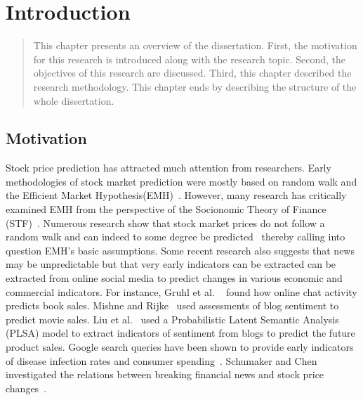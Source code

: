 \chapter{Introduction}
\label{introduction}

\begin{quote}
This chapter presents an overview of the dissertation. First, the motivation for this research is introduced along with the research topic. Second, the objectives of this research are discussed. Third, this chapter described the research methodology. This chapter ends by describing the structure of the whole dissertation.
\end{quote}

\section{Motivation}
Stock price prediction has attracted much attention from researchers. Early methodologies of stock market prediction were mostly based on random walk and the Efficient Market Hypothesis(EMH)~\cite{fama1965behavior}. However, many research has critically examined EMH from the perspective of the Socionomic Theory of Finance (STF)~\cite{prechter2007financial}. Numerous research show that stock market prices do not follow a random walk and can indeed to some degree be predicted~\cite{Butler1992} thereby calling into question EMH's basic assumptions. Some recent research also suggests that news may be unpredictable but that very early indicators can be extracted can be extracted from online social media to predict changes in various economic and commercial indicators. For instance, Gruhl et al. ~\cite{Gruhl2005} found how online chat activity predicts book sales. Mishne and Rijke~\cite{mishne2006capturing} used assessments of blog sentiment to predict movie sales. Liu et al.~\cite{liu2007arsa} used a Probabilistic Latent Semantic Analysis (PLSA) model to extract indicators of sentiment from blogs to predict the future product sales. Google search queries have been shown to provide early indicators of disease infection rates and consumer spending~\cite{choi2012predicting}. Schumaker and Chen investigated the relations between breaking financial news and stock price changes~\cite{schumaker2009textual}.

